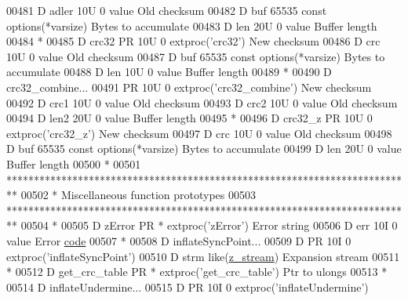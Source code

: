 \begin{DoxyCode}
00481      D  adler                        10U 0 value                                Old checksum
00482      D  buf                       65535    const options(*varsize)              Bytes to accumulate
00483      D  len                          20U 0 value                                Buffer length
00484       *
00485      D crc32           PR            10U 0 extproc('crc32')                     New checksum
00486      D  crc                          10U 0 value                                Old checksum
00487      D  buf                       65535    const options(*varsize)              Bytes to accumulate
00488      D  len                          10U 0 value                                Buffer length
00489       *
00490      D crc32\_combine...
00491                        PR            10U 0 extproc('crc32\_combine')             New checksum
00492      D  crc1                         10U 0 value                                Old checksum
00493      D  crc2                         10U 0 value                                Old checksum
00494      D  len2                         20U 0 value                                Buffer length
00495       *
00496      D crc32\_z         PR            10U 0 extproc('crc32\_z')                   New checksum
00497      D  crc                          10U 0 value                                Old checksum
00498      D  buf                       65535    const options(*varsize)              Bytes to accumulate
00499      D  len                          20U 0 value                                Buffer length
00500       *
00501       **************************************************************************
00502       *                     Miscellaneous function prototypes
00503       **************************************************************************
00504       *
00505      D zError          PR              *   extproc('zError')                    Error \textcolor{keywordtype}{string}
00506      D  err                          10I 0 value                                Error 
      \hyperlink{structcode}{code}
00507       *
00508      D inflateSyncPoint...
00509      D                 PR            10I 0 extproc('inflateSyncPoint')
00510      D  strm                               like(\hyperlink{structz__stream__s}{z\_stream})                       Expansion stream
00511       *
00512      D get\_crc\_table   PR              *   extproc('get\_crc\_table')             Ptr to ulongs
00513       *
00514      D inflateUndermine...
00515      D                 PR            10I 0 extproc('inflateUndermine')

\end{DoxyCode}
